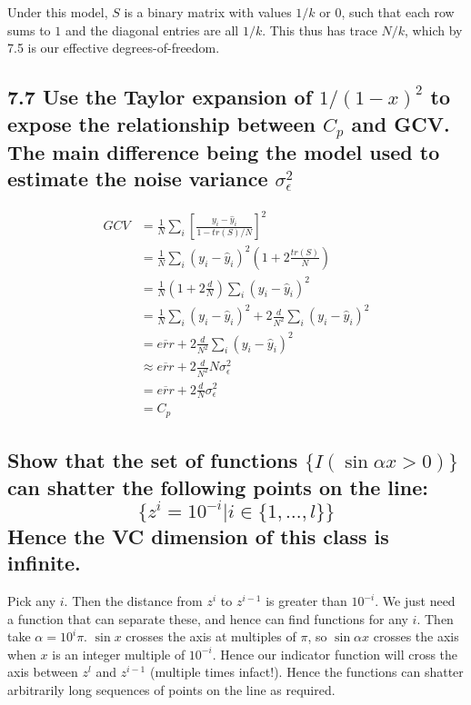 Under this model, $S$ is a binary matrix with values $1/k$ or 0, such that each row sums to $1$ and the diagonal entries are all $1/k$. This thus has trace $N/k$, which by 7.5 is our effective degrees-of-freedom.

\subsection*{7.7 Use the Taylor expansion of $1/(1-x)^2$ to expose the relationship between $C_p$ and GCV. The main difference being the model used to estimate the noise variance $\sigma_\epsilon^2$}

\begin{align*}
    GCV &= \frac{1}{N} \sum_i \left[ \frac{y_i - \hat{y}_i}{1 - tr(S) / N}\right]^2 \\
    &= \frac{1}{N} \sum_i \left( y_i - \hat{y}_i\right)^2 \left( 1 + 2 \frac{tr(S)}{N} \right)\\
    &= \frac{1}{N} \left( 1 + 2 \frac{d}{N} \right) \sum_i \left( y_i - \hat{y}_i\right)^2 \\
    &= \frac{1}{N}\sum_i \left( y_i - \hat{y}_i\right)^2  + 2 \frac{d}{N^2}  \sum_i \left( y_i - \hat{y}_i\right)^2 \\
    &= \overline{err}  + 2 \frac{d}{N^2}  \sum_i \left( y_i - \hat{y}_i\right)^2\\
    &\approx \overline{err}  + 2 \frac{d}{N^2}  N \sigma_\epsilon^2\\
    &= \overline{err}  + 2 \frac{d}{N} \sigma_\epsilon^2 \\
    &= C_p
\end{align*}

\subsection*{Show that the set of functions $\{I(\sin{\alpha x} > 0)\}$ can shatter the following points on the line:
$$\{z^i = 10^{-i} \vert i \in \{1, \dots, l\} \}$$
Hence the VC dimension of this class is infinite.}

Pick any $i$. Then the distance from $z^i$ to $z^{i-1}$ is greater than $10^{-i}$. We just need a function that can separate these, and hence can find functions for any $i$. Then take $\alpha = 10^i \pi$. $\sin{x}$ crosses the axis at multiples of $\pi$, so $\sin{\alpha x}$ crosses the axis when $x$ is an integer multiple of $10^{-i}$. Hence our indicator function will cross the axis between  $z^l$ and $z^{i-1}$ (multiple times infact!).
Hence the functions can shatter arbitrarily long sequences of points on the line as required.